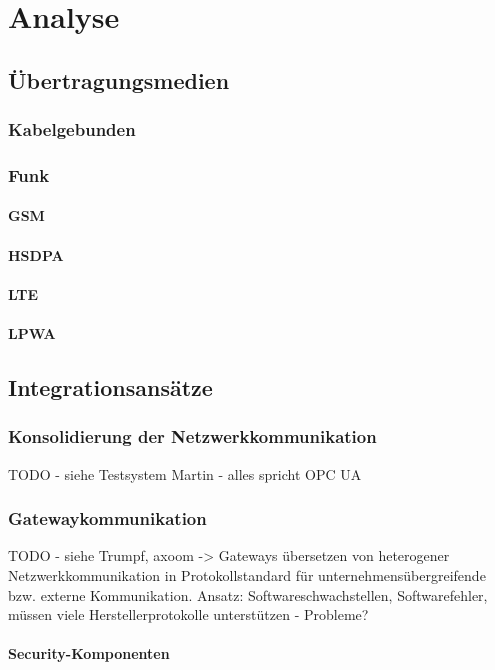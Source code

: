\chapter{Analyse}

\section{Übertragungsmedien}
\subsection{Kabelgebunden}
\subsection{Funk}
\subsubsection{\ac{GSM}}
\subsubsection{\ac{HSDPA}}
\subsubsection{\ac{LTE}}
\subsubsection{\ac{LPWA}}

\section{Integrationsansätze}
\subsection{Konsolidierung der Netzwerkkommunikation}
TODO - siehe Testsystem Martin - alles spricht OPC UA

\subsection{Gatewaykommunikation}
TODO - siehe Trumpf, axoom -> Gateways übersetzen von heterogener Netzwerkkommunikation in Protokollstandard für unternehmensübergreifende bzw. externe Kommunikation.
Ansatz: Softwareschwachstellen, Softwarefehler, müssen viele Herstellerprotokolle unterstützen - Probleme?

\subsubsection{Security-Komponenten}
